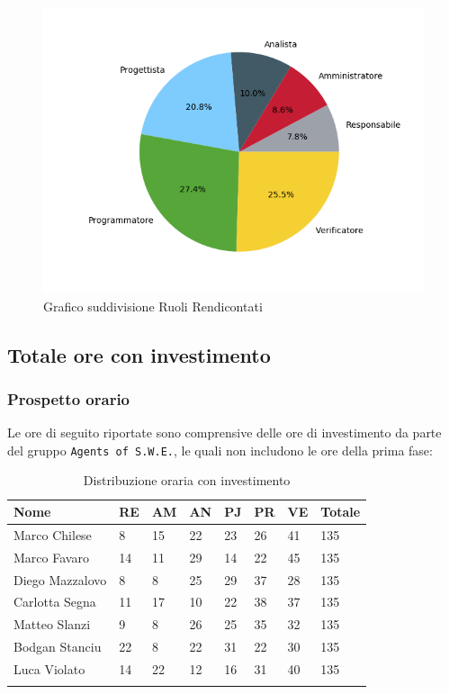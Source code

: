 \begin{figure}[H]
	\centering
  		\includegraphics[width=1\linewidth]{./images/torta_to.png}
  		\caption{Grafico suddivisione Ruoli Rendicontati}
  		\label{fig:grafico suddivione ruoli}
\end{figure}



\subsection{Totale ore con investimento}
\subsubsection{Prospetto orario}

Le ore di seguito riportate sono comprensive delle ore di investimento da parte del gruppo \texttt{Agents of S.W.E.}, le quali non includono le ore della prima fase:

\begin{longtable}{|C{.30\textwidth}|C{.06\textwidth}|C{.06\textwidth}|C{.06\textwidth} | C{.06\textwidth}| C{.06\textwidth} | C{.06\textwidth} | C{.10\textwidth} |}
\hline
\textbf{Nome} & \textbf{RE} & \textbf{AM} & \textbf{AN} & \textbf{PJ} & \textbf{PR} & \textbf{VE} & \textbf{Totale}\\
\hline 
Marco Chilese & 8 & 15 & 22 & 23 & 26 & 41 & 135\\
\hline
Marco Favaro & 14 & 11 & 29 & 14 & 22 & 45 & 135\\
\hline
Diego Mazzalovo & 8 & 8 & 25 & 29 & 37 & 28 & 135\\
\hline
Carlotta Segna & 11 & 17 & 10 & 22 & 38 & 37 & 135\\
\hline
Matteo Slanzi & 9 & 8 & 26 & 25 & 35 & 32 & 135\\
\hline
Bodgan Stanciu & 22 & 8 & 22 & 31 & 22 & 30 & 135\\
\hline
Luca Violato & 14 & 22 & 12 & 16 & 31 & 40 & 135 \\
\hline


\caption{Distribuzione oraria con investimento}
\label{Distribuzione oraria delle ore con investimento}
\end{longtable}

